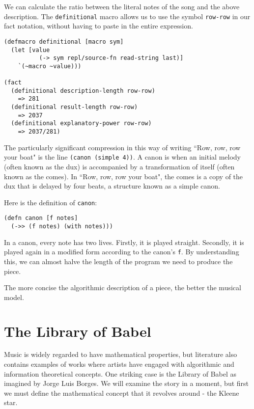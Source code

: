 \documentclass[numbers]{sigplanconf}
\begin{document}
We can calculate the ratio between the literal notes of the song and the above description.
The \verb|definitional| macro allows us to use the symbol \verb|row-row| in our fact notation, without
having to paste in the entire expression.

\begin{verbatim}
(defmacro definitional [macro sym]
  (let [value
          (-> sym repl/source-fn read-string last)]
    `(~macro ~value)))

(fact
  (definitional description-length row-row)
    => 281
  (definitional result-length row-row)
    => 2037
  (definitional explanatory-power row-row)
    => 2037/281)
\end{verbatim}

The particularly significant compression in this way of writing ``Row, row, row your boat" is the line \verb|(canon (simple 4))|.
A canon is when an initial melody (often known as the dux) is accompanied by a transformation of itself (often known as the comes).
In ``Row, row, row your boat", the comes is a copy of the dux that is delayed by four beats, a structure known as a simple canon.

Here is the definition of \verb|canon|:

\begin{verbatim}
(defn canon [f notes]
  (->> (f notes) (with notes)))
\end{verbatim}

In a canon, every note has two lives. Firstly, it is played straight. Secondly, it is played again in a modified form according
to the canon's \verb|f|. By understanding this, we can almost halve the length of the program we need to produce the piece.

The more concise the algorithmic description of a piece, the better the musical model.

\section{The Library of Babel}

Music is widely regarded to have mathematical properties, but literature also contains examples of works where artists have engaged
with algorithmic and information theoretical concepts. One striking case is the Library of Babel as imagined by Jorge Luis
Borges\cite{The Library of Babel}. We will examine the story in a moment, but first we must define the mathematical concept
that it revolves around - the Kleene star.
\end{document}
